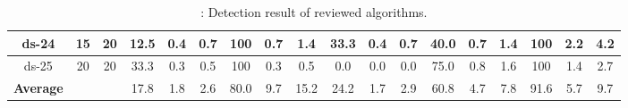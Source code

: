 \begin{table*}[h]
\begin{tabular}{|c|c|c|c|c|c|c|c|c|c|c|c|c|c|c|c|c|c|}
		\midrule
		ds-24 & 15    & 20    & 12.5  & 0.4   & 0.7   & 100 & 0.7   & 1.4   & 33.3  & 0.4   & 0.7   & 40.0  & 0.7   & 1.4   & 100 & 2.2   & 4.2 \\
		\midrule
		ds-25 & 20    & 20    & 33.3  & 0.3   & 0.5   & 100 & 0.3   & 0.5   & 0.0   & 0.0   & 0.0   & 75.0  & 0.8   & 1.6   & 100 & 1.4   & 2.7 \\
		\midrule
		\rowcolor[rgb]{ 1,  1,  0} \textbf{Average} &       &       & 17.8  & 1.8   & 2.6   & 80.0  & 9.7   & 15.2  & 24.2  & 1.7   & 2.9   & 60.8  & 4.7   & 7.8   & 91.6  & 5.7   & 9.7 \\
		\bottomrule
	\end{tabular}%
	\caption{: Detection result of reviewed algorithms. }
\label{tab:reviewedAL}%
\end{table*}%


